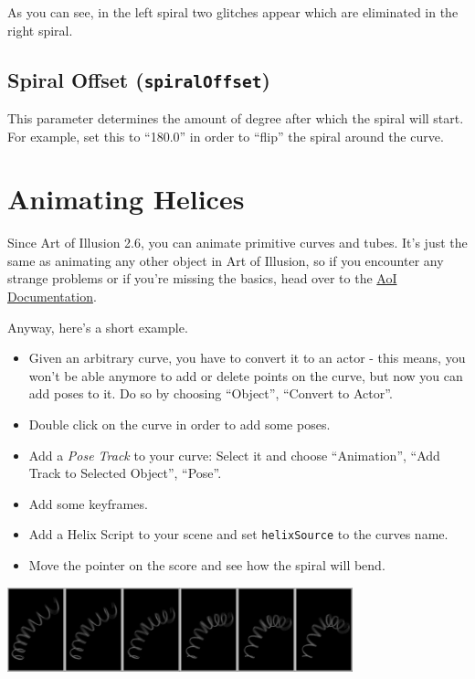 \documentclass[12pt,a4paper]{scrartcl}
\begin{document}
As you can see, in the left spiral two glitches appear which are
eliminated in the right spiral.

\subsection{Spiral Offset (\texttt{spiralOffset})}
This parameter determines the amount of degree after which the spiral
will start. For example, set this to ``180.0'' in order to ``flip''
the spiral around the curve.

\section{Animating Helices}
Since Art of Illusion 2.6, you can animate primitive curves and tubes.
It's just the same as animating any other object in Art of Illusion,
so if you encounter any strange problems or if you're missing the basics,
head over to the \href{http://www.housepixels.com/aoimanual/contents.html}{AoI Documentation}.

Anyway, here's a short example.
\begin{itemize}
	\item Given an arbitrary curve, you have to convert it to an actor -
		this means, you won't be able anymore to add or delete points
		on the curve, but now you can add poses to it. Do so by choosing
		``Object'', ``Convert to Actor''.
	\item Double click on the curve in order to add some poses.
	\item Add a \emph{Pose Track} to your curve: Select it and choose
		``Animation'', ``Add Track to Selected Object'', ``Pose''.
	\item Add some keyframes.
	\item Add a Helix Script to your scene and set \texttt{helixSource}
		to the curves name.
	\item Move the pointer on the score and see how the spiral will
		bend.
\end{itemize}

\begin{center}
	\includegraphics[width=0.75\textwidth]{../pics/helixAni.jpg}
\end{center}
\end{document}
